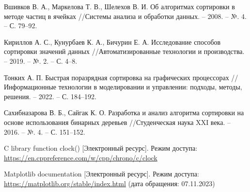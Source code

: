 


\renewcommand\bibname{Список использованных источников}
\begin{thebibliography}{}

 Вшивков В. А., Маркелова Т. В., Шелехов В. И. Об алгоритмах сортировки в методе частиц в ячейках //Системы анализа и обработки данных. – 2008. – №. 4. – С. 79--92.

  Кириллов А. С., Кунурбаев К. А., Бичурин Е. А. Исследование способов сортировки значений данных //Автоматизированные технологии и производства. – 2019. – №. 2. – С. 4--8.

 Тонких А. П. Быстрая поразрядная сортировка на графических процессорах //Информационные технологии в моделировании и управлении: подходы, методы, решения. – 2022. – С. 184--192.

 Сахибназарова В. Б., Сайгак К. О. Разработка и анализ алгоритма сортировки на основе использования бинарных деревьев //Студенческая наука XXI века. – 2016. – №. 4. – С. 151--152.


 C library function clock() [Электронный ресурс]. Режим доступа: \url{https://en.cppreference.com/w/cpp/chrono/c/clock}


 Matplotlib documentation [Электронный ресурс]. Режим доступа: \url{https://matplotlib.org/stable/index.html} (дата обращения: 07.11.2023)

\end{thebibliography}